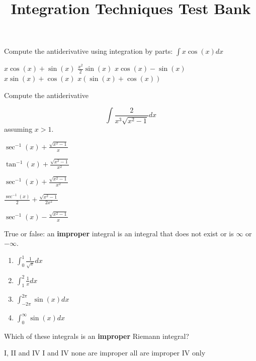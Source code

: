 \documentclass[10pt]{exam}
\title{Integration Techniques Test Bank}
\date{}
\begin{document}
\maketitle

\begin{questions}

\question %
Compute the antiderivative using integration by parts: $ \int x \cos(x) dx$


\begin{choices}
\choice $x \cos(x) + \sin(x)$
\choice $\frac{x^2}{2}\sin(x)$
\choice $x \cos(x) - \sin(x)$
\choice $x \sin(x) + \cos(x)$
\choice $x (\sin(x) + \cos(x))$
\end{choices}


\question Compute the antiderivative \label{trigsub}

$$\int \frac{2}{x^3\sqrt{x^2 -1}}dx$$
assuming $x>1$.

\begin{choices}



\choice $\sec^{-1}(x) + \frac{\sqrt{x^2-1}}{x}$	

\choice $\tan^{-1}(x) + \frac{\sqrt{x^2-1}}{x^2}$

\choice $\sec^{-1}(x) + \frac{\sqrt{x^2-1}}{x^2}$ %

\choice $\frac{\sec^{-1}(x)}{2} + \frac{\sqrt{x^2-1}}{2x^2}$

\choice $\sec^{-1}(x) - \frac{\sqrt{x^2-1}}{x}$	

\end{choices}

\question \label{B} True or false: an \textbf{improper} integral is an integral that does not exist or is $\infty$ or $-\infty$. %




\begin{enumerate}[I]
\item $\int_{0}^{1}\frac{1}{\sqrt{x}} dx$
\item $\int_{1}^{2}\frac{1}{x} dx$
\item $\int_{-2\pi}^{2\pi}\sin(x) dx$
\item $\int_{0}^{\infty}\sin(x) dx$
\end{enumerate}

\question \label{A} Which of these integrals is an \textbf{improper} Riemann integral?

\begin{choices} %
\choice I, II and IV
\choice I and IV
\choice none are improper
\choice all are improper
\choice IV only
\end{choices}






\end{questions}
\end{document}
